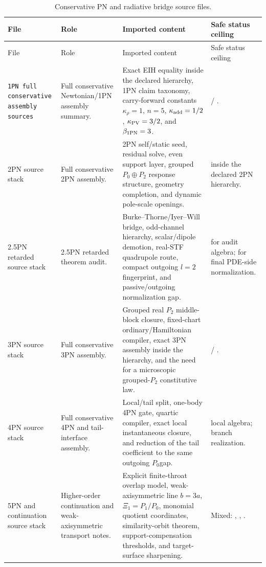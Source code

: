 \begin{longtable}{@{}L{0.29\textwidth}L{0.24\textwidth}L{0.31\textwidth}L{0.10\textwidth}@{}}
\caption{Conservative PN and radiative bridge source files.}\label{tab:pn-source-files}\\
\toprule
File & Role & Imported content & Safe status ceiling \\
\midrule
\endfirsthead
\toprule
File & Role & Imported content & Safe status ceiling \\
\midrule
\endhead
\begingroup\footnotesize\texttt{1PN full conservative assembly sources}\endgroup{} & Full conservative Newtonian/1PN assembly summary. & Exact EIH equality inside the declared hierarchy, 1PN claim taxonomy, carry-forward constants \(\kappa_\rho=1\), \(n=5\), \(\kappa_{\rm add}=1/2\), \(\kappa_{\rm PV}=3/2\), and \(\beta_{\rm 1PN}=3\). & \StatusExactClosure{} / \StatusReduced{}. \\
\addlinespace
2PN source stack & Full conservative 2PN assembly. & 2PN self/static seed, residual solve, even support layer, grouped \(P_0\oplus P_2\) response structure, geometry completion, and dynamic pole-scale openings. & \StatusExactClosure{} inside the declared 2PN hierarchy. \\
\addlinespace
2.5PN retarded source stack & 2.5PN retarded theorem audit. & Burke--Thorne/Iyer--Will bridge, odd-channel hierarchy, scalar/dipole demotion, real-STF quadrupole route, compact outgoing \(l=2\) fingerprint, and passive/outgoing normalization gap. & \StatusExactClosure{} for audit algebra; \StatusOpen{} for final PDE-side normalization. \\
\addlinespace
3PN source stack & Full conservative 3PN assembly. & Grouped real \(P_2\) middle-block closure, fixed-chart ordinary/Hamiltonian compiler, exact 3PN assembly inside the hierarchy, and the need for a microscopic grouped-\(P_2\) constitutive law. & \StatusExactClosure{} / \StatusReduced{}. \\
\addlinespace
4PN source stack & Full conservative 4PN and tail-interface assembly. & Local/tail split, one-body 4PN gate, quartic compiler, exact local instantaneous closure, and reduction of the tail coefficient to the same outgoing \(P_0\)\newline gap. & \StatusExactClosure{} local algebra; \StatusOpen{} branch realization. \\
\addlinespace
5PN and continuation source stack & Higher-order continuation and weak-axisymmetric transport notes. & Explicit finite-throat overlap model, weak-axisymmetric line \(b=3a\), \(\Xi_1=P_1/P_0\), monomial quotient coordinates, similarity-orbit theorem, support-compensation thresholds, and target-surface sharpening. & Mixed: \StatusExactClosure{}, \StatusNumerical{}, \StatusOpen{}. \\
\bottomrule
\end{longtable}

